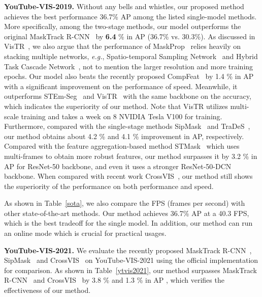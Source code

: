 \documentclass[runningheads]{llncs}
\begin{document}
\noindent \textbf{YouTube-VIS-2019.} Without any bells and whistles, our proposed method achieves the best performance 36.7\% AP among the listed single-model methods. More specifically, among the two-stage methods, our model outperforms the original MaskTrack R-CNN~\cite{yang2019video} by \textbf{6.4} \% in AP (36.7\% vs. 30.3\%). As discussed in VisTR~\cite{wang2021end}, we also argue that the performance of MaskProp~\cite{bertasius2020classifying} relies heavily on stacking multiple networks, \emph{e.g.}, Spatio-temporal Sampling Network~\cite{bertasius2018object} and Hybrid Task Cascade Network~\cite{chen2019hybrid}, not to mention the larger resolution and more training epochs. Our model also beats the recently proposed CompFeat~\cite{fu2020compfeat} by 1.4 \% in AP with a significant improvement on the performance of speed. Meanwhile, it outperforms STEm-Seg~\cite{athar2020stem} and VisTR~\cite{wang2021end} with the same backbone on the accuracy, which indicates the superiority of our method. Note that VisTR utilizes multi-scale training and takes a week on 8 NVIDIA Tesla V100 for training. Furthermore, compared with the single-stage methods SipMask~\cite{cao2020sipmask} and TraDeS~\cite{wu2021track}, our method obtains about 4.2 \% and 4.1 \% improvement in AP, respectively. Compared with the feature aggregation-based method STMask~\cite{li2021spatial} which uses multi-frames to obtain more robust features, our method surpasses it by 3.2 \% in AP for ResNet-50 backbone, and even it uses a stronger ResNet-50-DCN backbone. When compared with recent work CrossVIS~\cite{yang2021crossover}, our method still shows the superiority of the performance on both performance and speed.

As shown in Table~\ref{sota}, we also compare the FPS (frames per second) with other state-of-the-art methods. Our method achieves 36.7\% AP at a 40.3 FPS, which is the best tradeoff for the single model. In addition, our method can run an online mode which is crucial for practical usages.



\noindent \textbf{YouTube-VIS-2021.} We evaluate the recently proposed MaskTrack R-CNN~\cite{yang2019video}, SipMask~\cite{cao2020sipmask} and CrossVIS~\cite{yang2021crossover} on YouTube-VIS-2021 using the official implementation for comparison. As shown in Table~\ref{ytvis2021}, our method surpasses MaskTrack R-CNN~\cite{yang2019video} and CrossVIS~\cite{yang2021crossover} by 3.8 \% and 1.3 \% in AP , which verifies the effectiveness of our method.
\end{document}
